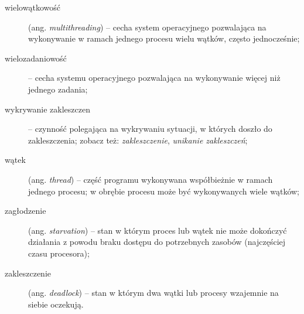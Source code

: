 \documentclass[12pt]{article}
\begin{document}
\begin{description}
    \item[wielowątkowość] (ang. \emph{multithreading}) -- cecha system operacyjnego pozwalająca na wykonywanie w ramach jednego procesu wielu wątków, często jednocześnie;
    \item[wielozadaniowość] -- cecha systemu operacyjnego pozwalająca na wykonywanie więcej niż jednego zadania;
    \item[wykrywanie zakleszczen] -- czynność polegająca na wykrywaniu sytuacji, w których doszło do zakleszczenia; zobacz też: \emph{zakleszczenie}, \emph{unikanie zakleszczeń};
    \item[wątek] (ang. \emph{thread}) -- część programu wykonywana współbieżnie w ramach jednego procesu; w obrębie procesu może być wykonywanych wiele wątków;
    \item[zagłodzenie] (ang. \emph{starvation}) -- stan w którym proces lub wątek nie może dokończyć działania z powodu braku dostępu do potrzebnych zasobów (najczęściej czasu procesora);
    \item[zakleszczenie] (ang. \emph{deadlock}) -- stan w którym dwa wątki lub procesy wzajemnie na siebie oczekują.
\end{description}
\end{document}
